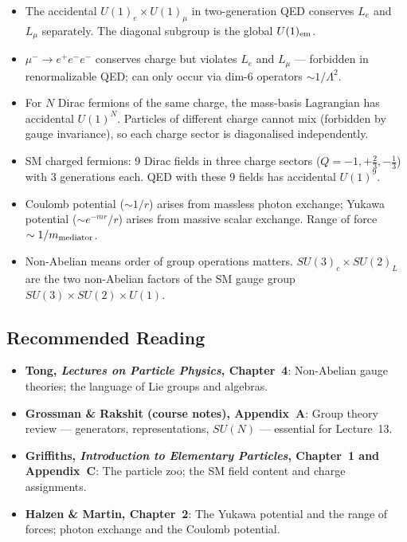 \documentclass[../main.tex]{subfiles}
\begin{document}
\begin{itemize}
  \item The accidental $U(1)_e\times U(1)_\mu$ in two-generation QED conserves $L_e$ and $L_\mu$ separately.  The diagonal subgroup is the global $U(1)_{\rm em}$.
  \item $\mu^-\to e^+e^-e^-$ conserves charge but violates $L_e$ and $L_\mu$ — forbidden in renormalizable QED; can only occur via dim-6 operators $\sim 1/\Lambda^2$.
  \item For $N$ Dirac fermions of the same charge, the mass-basis Lagrangian has accidental $U(1)^N$.  Particles of different charge cannot mix (forbidden by gauge invariance), so each charge sector is diagonalised independently.
  \item SM charged fermions: 9 Dirac fields in three charge sectors ($Q=-1,+\tfrac{2}{3},-\tfrac{1}{3}$) with 3 generations each.  QED with these 9 fields has accidental $U(1)^9$.
  \item Coulomb potential ($\sim 1/r$) arises from massless photon exchange; Yukawa potential ($\sim e^{-mr}/r$) arises from massive scalar exchange.  Range of force $\sim 1/m_{\rm mediator}$.
  \item Non-Abelian means order of group operations matters.  $SU(3)_c\times SU(2)_L$ are the two non-Abelian factors of the SM gauge group $SU(3)\times SU(2)\times U(1)$.
\end{itemize}

\subsection*{Recommended Reading}

\begin{itemize}
  \item \textbf{Tong, \textit{Lectures on Particle Physics}, Chapter~4}:
    Non-Abelian gauge theories; the language of Lie groups and algebras.
  \item \textbf{Grossman \& Rakshit (course notes), Appendix~A}:
    Group theory review — generators, representations, $SU(N)$ — essential for Lecture~13.
  \item \textbf{Griffiths, \textit{Introduction to Elementary Particles}, Chapter~1 and Appendix~C}:
    The particle zoo; the SM field content and charge assignments.
  \item \textbf{Halzen \& Martin, Chapter~2}:
    The Yukawa potential and the range of forces; photon exchange and the Coulomb potential.
\end{itemize}
\end{document}
